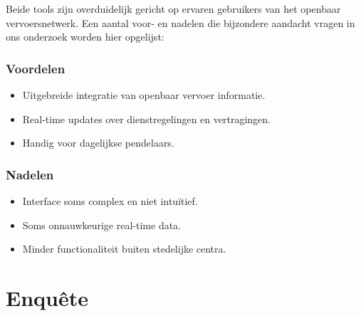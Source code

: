 Beide tools zijn overduidelijk gericht op ervaren gebruikers van het openbaar vervoersnetwerk. Een aantal voor- en nadelen die bijzondere aandacht vragen in ons onderzoek worden hier opgelijst:

\subsubsection*{Voordelen}
\begin{itemize}
    \item Uitgebreide integratie van openbaar vervoer informatie.
    \item Real-time updates over dienstregelingen en vertragingen.
    \item Handig voor dagelijkse pendelaars.
\end{itemize}
\subsubsection*{Nadelen}
\begin{itemize}
    \item Interface soms complex en niet intuïtief.
    \item Soms onnauwkeurige real-time data.
    \item Minder functionaliteit buiten stedelijke centra.
\end{itemize}

\section{Enquête}
\label{sec:enquete}



